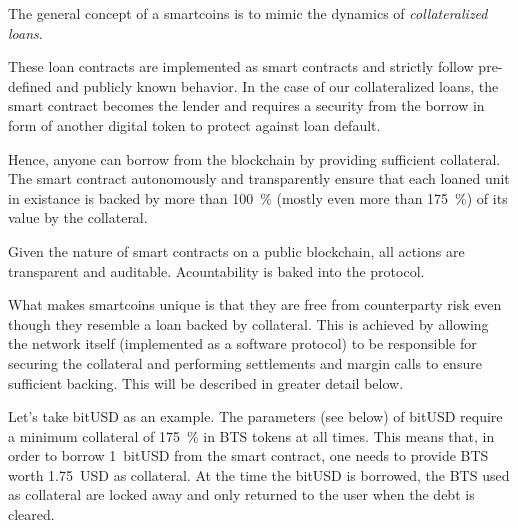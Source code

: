 The general concept of a smartcoins is to mimic the dynamics of
\emph{collateralized loans}.

These loan contracts are implemented as smart contracts and strictly follow
pre-defined and publicly known behavior. In the case of our collateralized
loans, the smart contract becomes the lender and requires a security from the
borrow in form of another digital token to protect against loan default.

Hence, anyone can borrow from the blockchain by providing sufficient
collateral. The smart contract autonomously and transparently ensure that each
loaned unit in existance is backed by more than \SI{100}{\percent} (mostly even
more than \SI{175}{\percent}) of its value by the collateral.

Given the nature of smart contracts on a public blockchain, all actions are
transparent and auditable. Acountability is baked into the protocol.

What makes smartcoins unique is that they are free from counterparty risk even
though they resemble a loan backed by collateral. This is achieved by allowing
the network itself (implemented as a software protocol) to be responsible for
securing the collateral and performing settlements and margin calls to ensure
sufficient backing. This will be described in greater detail below.

Let's take bitUSD as an example. The parameters (see below) of bitUSD require
a minimum collateral of \SI{175}{\percent} in BTS tokens at all times. This
means that, in order to borrow \SI{1}{bitUSD} from the smart contract, one
needs to provide BTS worth \SI{1.75}{USD} as collateral. At the time the bitUSD
is borrowed, the BTS used as collateral are locked away and only returned to
the user when the debt is cleared.
